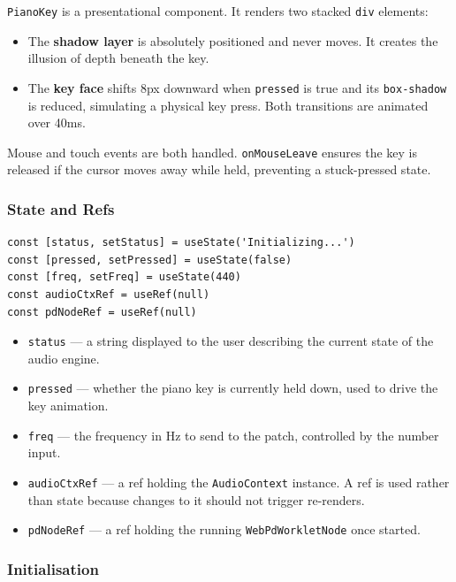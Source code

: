 \documentclass[12pt,a4paper]{article}
\begin{document}
\texttt{PianoKey} is a presentational component. It renders two stacked \texttt{div} elements:

\begin{itemize}
  \item The \textbf{shadow layer} is absolutely positioned and never moves. It creates the illusion of depth beneath the key.
  \item The \textbf{key face} shifts 8px downward when \texttt{pressed} is true and its \texttt{box-shadow} is reduced, simulating a physical key press. Both transitions are animated over 40ms.
\end{itemize}

Mouse and touch events are both handled. \texttt{onMouseLeave} ensures the key is released if the cursor moves away while held, preventing a stuck-pressed state.

\subsubsection{State and Refs}

\begin{lstlisting}[style=js, caption={State and refs in TestPd}]
const [status, setStatus] = useState('Initializing...')
const [pressed, setPressed] = useState(false)
const [freq, setFreq] = useState(440)
const audioCtxRef = useRef(null)
const pdNodeRef = useRef(null)
\end{lstlisting}

\begin{itemize}
  \item \texttt{status} — a string displayed to the user describing the current state of the audio engine.
  \item \texttt{pressed} — whether the piano key is currently held down, used to drive the key animation.
  \item \texttt{freq} — the frequency in Hz to send to the patch, controlled by the number input.
  \item \texttt{audioCtxRef} — a ref holding the \texttt{AudioContext} instance. A ref is used rather than state because changes to it should not trigger re-renders.
  \item \texttt{pdNodeRef} — a ref holding the running \texttt{WebPdWorkletNode} once started.
\end{itemize}

\subsubsection{Initialisation}
\end{document}
